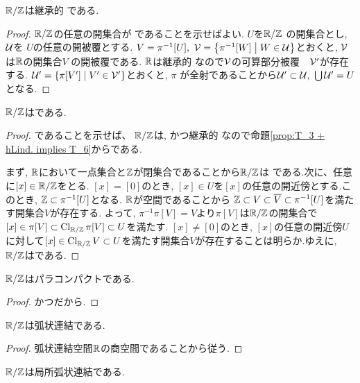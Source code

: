 \documentclass[uplatex, dvipdfmx, a4paper, 12pt, class=jsbook, crop=false]{standalone}
\begin{document}
\begin{property}
	$\mathbb{R} / \mathbb{Z}$は継承的 \Lindelof である.
\end{property}
\begin{proof}
	$\mathbb{R} / \mathbb{Z}$の任意の開集合が \Lindelof であることを示せばよい. $U$を$\mathbb{R} / \mathbb{Z}$
	の開集合とし, ${\cal U}$を $U$の任意の開被覆とする. $V=\pi^{-1}[U],\ {\cal V}=\setcomp{\pi^{-1}[W]}{W\in {\cal U}}$とおくと, ${\cal V}$は$\mathbb{R}$の開集合$V$
	の開被覆である. $\mathbb{R}$は継承的 \Lindelof なので${\cal V}$の可算部分被覆　${\cal V}'$が存在する. ${\cal U}'=\setcomp{\pi[V']}{V'\in {\cal V}'}$とおくと, $\pi$
	が全射であることから${\cal U}'\subset {\cal U},\ \bigcup {\cal U}'=U$となる. 
\end{proof}


\begin{property}
	$\mathbb{R}/ \mathbb{Z}$はである.
\end{property}

\begin{proof}
	であることを示せば、
	$\mathbb{R} / \mathbb{Z}$は, かつ継承的 \Lindelof なので命題\ref{prop:T_3 + hLind. implies T_6}からである.
	
	まず, $ \mathbb{R} $において一点集合と$ \mathbb{Z} $が閉集合であることから$ \mathbb{R} / \mathbb{Z}$は である.次に、任意に$[x]\in \mathbb{R} /\mathbb{Z}$をとる. $[x]=[0]$のとき, $[x]\in U$を$[x]$の任意の開近傍とする.このとき, $\mathbb{Z}\subset \pi^{-1}[U]$となる. $\mathbb{R}$が空間であることから
	$\mathbb{Z}\subset V\subset \overline{V}\subset \pi^{-1}[U]$を満たす開集合$V$が存在する. よって, $\pi^{-1}\pi[V]=V$より$\pi[V]$は$\mathbb{R} /\mathbb{Z}$の開集合で$[x]\in \pi[V]\subset \mathop{\mathrm{Cl}}\nolimits_{\mathbb{R}/\mathbb{Z}} \pi[V] \subset U$を満たす. $[x]\neq [0]$のとき, $[x]$の任意の開近傍$U$
	に対して$[x]\in \mathop{\mathrm{Cl}}\nolimits_{\mathbb{R}/\mathbb{Z}}V\subset U$を満たす開集合$V$が存在することは明らか.ゆえに, $ \mathbb{R} / \mathbb{Z}$はである.
\end{proof}

\begin{property}
	$ \mathbb{R} / \mathbb{Z} $はパラコンパクトである.
\end{property}
\begin{proof}
	かつ\Lindelof だから.
\end{proof}

\begin{property}
	$\mathbb{R} / \mathbb{Z}$は弧状連結である.
\end{property}
\begin{proof}
	弧状連結空間$\mathbb{R}$の商空間であることから従う.
\end{proof}

\begin{property}
	$\mathbb{R} / \mathbb{Z}$は局所弧状連結である.
\end{property}
\end{document}

